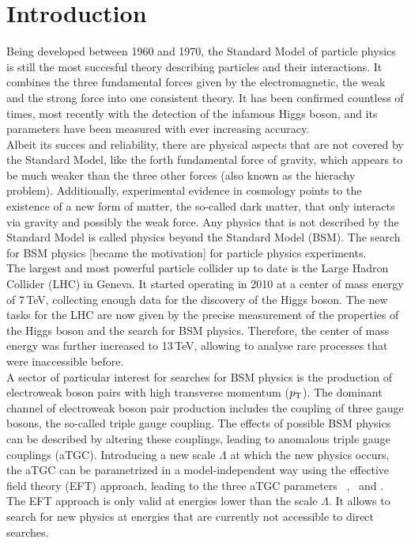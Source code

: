\chapter*{Introduction}
Being developed between 1960 and 1970, the Standard Model of particle physics is still the most succesful theory describing particles and their interactions. It combines the three fundamental forces given by the electromagnetic, the weak and the strong force into one consistent theory. It has been confirmed countless of times, most recently with the detection of the infamous Higgs boson, and its parameters have been measured with ever increasing accuracy.\\

Albeit its succes and reliability, there are physical aspects that are not covered by the Standard Model, like the forth fundamental force of gravity, which appears to be much weaker than the three other forces (also known as the hierachy problem). Additionally, experimental evidence in cosmology points to the existence of a new form of matter, the so-called dark matter, that only interacts via gravity and possibly the weak force. Any physics that is not described by the Standard Model is called physics beyond the Standard Model (BSM). The search for BSM physics [became the motivation] for particle physics experiments.\\

The largest and most powerful particle collider up to date is the Large Hadron Collider (LHC) in Geneva. It started operating in 2010 at a center of mass energy of 7\,TeV, collecting enough data for the discovery of the Higgs boson. The new tasks for the LHC are now given by the precise measurement of the properties of the Higgs boson and the search for BSM physics. Therefore, the center of mass energy was further increased to 13\,TeV, allowing to analyse rare processes that were inaccessible before.\\

A sector of particular interest for searches for BSM physics is the production of electroweak boson pairs with high transverse momentum ($p_{\rm T}$). The dominant channel of electroweak boson pair production includes the coupling of three gauge bosons, the so-called triple gauge coupling. The effects of possible BSM physics can be described by altering these couplings, leading to anomalous triple gauge couplings (aTGC). Introducing a new scale $\Lambda$ at which the new physics occurs, the aTGC can be parametrized in a model-independent way using the effective field theory (EFT) approach, leading to the three aTGC parameters \Tcwww \ , \Tccw \ and \Tcb . The EFT approach is only valid at energies lower than the scale $\Lambda$. It allows to search for new physics at energies that are currently not accessible to direct searches.\\

